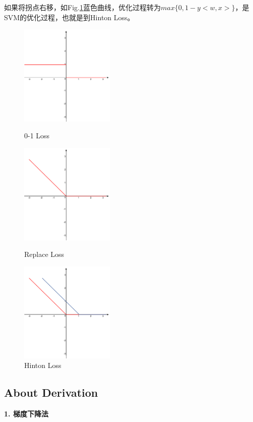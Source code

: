 \documentclass[12pt,UTF8,AutoFakeBold]{article}
\begin{document}
如果将拐点右移，如Fig.\ref{fig3}蓝色曲线，优化过程转为\(max\{0, 1-y<w,x>\}\)，是SVM的优化过程，也就是到Hinton Loss。
\begin{figure}[htbp]
\centering
\begin{minipage}[t]{0.3\textwidth}
\centering
\includegraphics[width=4.5cm]{figs/0-1.png}
\caption{0-1 Loss}
\label{fig1} 
\end{minipage}
\begin{minipage}[t]{0.3\textwidth}
\centering
\includegraphics[width=4.5cm]{figs/-z.png}
\caption{Replace Loss}
\label{fig2} 
\end{minipage}
\begin{minipage}[t]{0.3\textwidth}
\centering
\includegraphics[width=4.5cm]{figs/hinton.png}
\caption{Hinton Loss}
\label{fig3} 
\end{minipage}
\end{figure}

\subsection{About Derivation}
\textbf{1. 梯度下降法}
\end{document}
